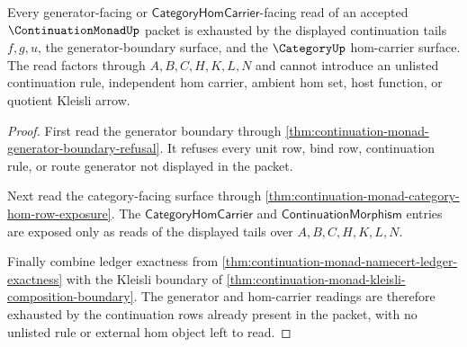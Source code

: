 \begin{theorem}
\label{thm:continuation-monad-generator-hom-route-exhaustion}
Every generator-facing or $\mathsf{CategoryHomCarrier}$-facing read of an accepted $\ContinuationMonadUp$ packet is exhausted by the displayed continuation tails $f,g,u$, the generator-boundary surface, and the $\CategoryUp$ hom-carrier surface. The read factors through $A,B,C,H,K,L,N$ and cannot introduce an unlisted continuation rule, independent hom carrier, ambient hom set, host function, or quotient Kleisli arrow.
\end{theorem}
\begin{proof}
First read the generator boundary through \autoref{thm:continuation-monad-generator-boundary-refusal}. It refuses every unit row, bind row, continuation rule, or route generator not displayed in the packet.

Next read the category-facing surface through \autoref{thm:continuation-monad-category-hom-row-exposure}. The $\mathsf{CategoryHomCarrier}$ and $\mathsf{ContinuationMorphism}$ entries are exposed only as reads of the displayed tails over $A,B,C,H,K,L,N$.

Finally combine ledger exactness from \autoref{thm:continuation-monad-namecert-ledger-exactness} with the Kleisli boundary of \autoref{thm:continuation-monad-kleisli-composition-boundary}. The generator and hom-carrier readings are therefore exhausted by the continuation rows already present in the packet, with no unlisted rule or external hom object left to read.
\end{proof}

